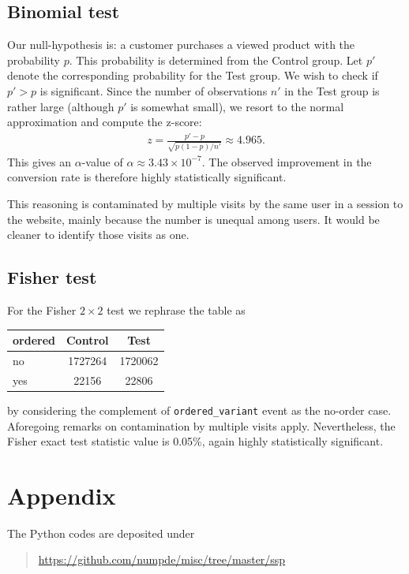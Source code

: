 \documentclass[12pt,a4paper]{article}
\begin{document}
    
    \subsection{Binomial test}
    
    Our null-hypothesis is:
    a customer purchases a viewed product
    with the probability $p$.
    This probability
    is determined from the Control group.
    Let $p'$ denote the corresponding probability
    for the Test group.
    We wish to check if $p' > p$ is significant.
    Since the number of observations 
    $n'$
    in the Test group is rather large
    (although $p'$ is somewhat small),
    we resort to the normal approximation
    and
    compute the z-score:
    \begin{align}
        z
        =
        \frac{
            p' - p
        }{
            \sqrt{ p (1 - p) / n' }
        }
        \approx
        4.965
        .
    \end{align}
    This gives an $\alpha$-value of 
    $\alpha \approx 3.43 \times 10^{-7}$.
    The observed improvement 
    in the conversion rate
    is 
    therefore
    highly statistically significant.
    
    This reasoning is contaminated
    by multiple visits 
    by the same user in a session
    to the website,
    mainly because the number is unequal among users.
    It would be cleaner to identify those visits as one.
    
    
    \subsection{Fisher test}
    
    For the Fisher $2 \times 2$ test we rephrase the table as
    \begin{center}
        \begin{tabular}{l|cc}
            ordered & Control & Test    \\
            \hline
            no & 1727264 & 1720062 \\
            yes & 22156   & 22806  
        \end{tabular}
    \end{center}
    by considering the complement 
    of \verb|ordered_variant| event as
    the no-order case.
    Aforegoing remarks on contamination by 
    multiple visits
    apply.
    Nevertheless,
    the Fisher exact test statistic value is 0.05\%,
    again highly statistically significant.
    
    
    
    \section*{Appendix}
    
    The Python codes are deposited under
    \begin{quote}
        \url{https://github.com/numpde/misc/tree/master/ssp}
    \end{quote}
\end{document}
